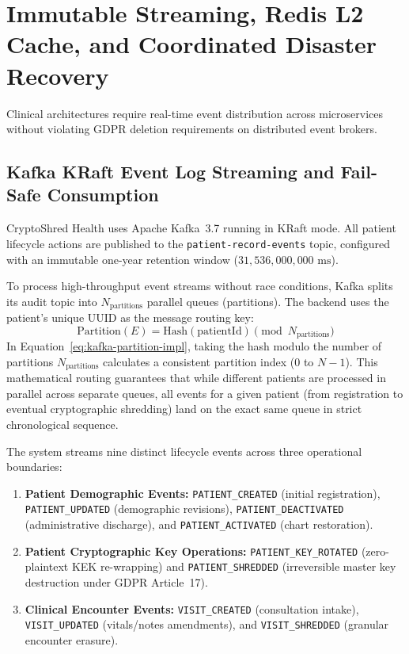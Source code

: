 
\section{Immutable Streaming, Redis L2 Cache, and Coordinated Disaster Recovery}\label{section:impl-streaming}

Clinical architectures require real-time event distribution across microservices without violating GDPR deletion requirements on distributed event brokers.

\subsection{Kafka KRaft Event Log Streaming and Fail-Safe Consumption}

CryptoShred Health uses Apache Kafka~3.7 running in KRaft mode. All patient lifecycle actions are published to the \texttt{patient-record-events} topic, configured with an immutable one-year retention window ($31,536,000,000\text{~ms}$).

To process high-throughput event streams without race conditions, Kafka splits its audit topic into $N_{\text{partitions}}$ parallel queues (partitions). The backend uses the patient's unique UUID as the message routing key:
\begin{equation}
    \text{Partition}(E) = \text{Hash}(\text{patientId}) \pmod{N_{\text{partitions}}}
    \label{eq:kafka-partition-impl}
\end{equation}
In Equation~\ref{eq:kafka-partition-impl}, taking the hash modulo the number of partitions $N_{\text{partitions}}$ calculates a consistent partition index ($0$ to $N-1$). This mathematical routing guarantees that while different patients are processed in parallel across separate queues, all events for a given patient (from registration to eventual cryptographic shredding) land on the exact same queue in strict chronological sequence.

The system streams nine distinct lifecycle events across three operational boundaries:
\begin{enumerate}
    \item \textbf{Patient Demographic Events:} \texttt{PATIENT\_CREATED} (initial registration), \texttt{PATIENT\_UPDATED} (demographic revisions), \texttt{PATIENT\_DEACTIVATED} (administrative discharge), and \texttt{PATIENT\_ACTIVATED} (chart restoration).
    \item \textbf{Patient Cryptographic Key Operations:} \texttt{PATIENT\_KEY\_ROTATED} (zero-plaintext KEK re-wrapping) and \texttt{PATIENT\_SHREDDED} (irreversible master key destruction under GDPR Article~17).
    \item \textbf{Clinical Encounter Events:} \texttt{VISIT\_CREATED} (consultation intake), \texttt{VISIT\_UPDATED} (vitals/notes amendments), and \texttt{VISIT\_SHREDDED} (granular encounter erasure).
\end{enumerate}

